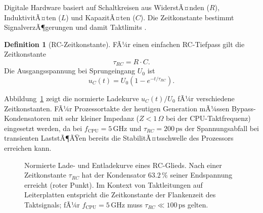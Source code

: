 ﻿\documentclass[a4paper,12pt]{scrreprt}
\theoremstyle{definition}
\newtheorem{definition}{Definition}[chapter]
\begin{document}
	Digitale Hardware basiert auf Schaltkreisen aus WiderstÃ¤nden ($R$),
	InduktivitÃ¤ten ($L$) und KapazitÃ¤ten ($C$). Die Zeitkonstante bestimmt
	SignalverzÃ¶gerungen und damit Taktlimits \cite{Epp2026physd}.

	\begin{definition}[RC-Zeitkonstante]
		FÃ¼r einen einfachen RC-Tiefpass gilt die Zeitkonstante
		\[
		\tau_{RC} = R \cdot C.
		\]
		Die Ausgangsspannung bei Sprungeingang $U_0$ ist
		\[
		u_C(t) = U_0 \left(1 - e^{-t/\tau_{RC}}\right).
		\]
	\end{definition}

	Abbildung~\ref{fig:rc-charge} zeigt die normierte Ladekurve
	$u_C(t)/U_0$ fÃ¼r verschiedene Zeitkonstanten. FÃ¼r Prozessortakte
	der heutigen Generation mÃ¼ssen Bypass-Kondensatoren mit sehr kleiner
	Impedanz ($Z < 1\,\Omega$ bei der CPU-Taktfrequenz) eingesetzt werden,
	da bei $f_{\text{CPU}} = 5\,\text{GHz}$ und $\tau_{RC} = 200\,\text{ps}$
	der Spannungsabfall bei transienten LaststÃ¶ÃŸen bereits die
	StabilitÃ¤tsschwelle des Prozessors erreichen kann.

	\begin{figure}[H]
		\centering
		\caption{Normierte Lade- und Entladekurve eines RC-Glieds. Nach einer
			Zeitkonstante $\tau_{RC}$ hat der Kondensator $63.2\,\%$ seiner
			Endspannung erreicht (roter Punkt). Im Kontext von Taktleitungen auf
			Leiterplatten entspricht die Zeitkonstante der Flankenzeit des
			Taktsignals; fÃ¼r $f_{\text{CPU}} = 5\,\text{GHz}$ muss
			$\tau_{RC} \ll 100\,\text{ps}$ gelten.}
		\label{fig:rc-charge}
	\end{figure}
\end{document}
